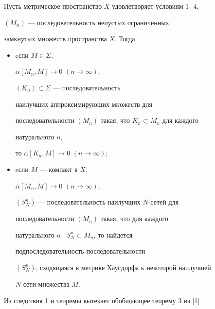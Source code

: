 \begin{thmnonum}


Пусть метрическое пространство $X$ удовлетворяет условиям $1$--\,$4$,


$(M_{n})$ --- последовательность непустых ограниченных 


замкнутых множеств пространства $X$. Тогда 


\begin{itemize}


\item[A.] eсли $M \in \Sigma$,


$\alpha [M_{n},M] \rightarrow 0$ $(n \rightarrow \infty)$, 


$(K_{n}) \subset \Sigma $ --- последовательность 


наилучших аппроксимирующих множеств для 


последовательности $(M_{n})$ такая, что $K_{n} \subset M_{n}$ для каждого


натурального $n$,


то $\alpha [K_{n},M] \rightarrow 0$ $(n \rightarrow \infty);$




\item[B.] eсли $M$ --- компакт в $X$,


$\alpha [M_{n},M] \rightarrow 0$ $(n \rightarrow \infty)$, 


$(S_{N}^{n})$ --- последовательность наилучших $N$-сетей для


последовательности $(M_{n})$ такая, что для каждого


натурального $n$ \ $S_{N}^{n} \subset M_{n}$, то найдется 


подпоследовательность последовательности


$(S_{N}^{n})$, сходящаяся в метрике Хаусдорфа к некоторой наилучшей 


$N$-сети множества $M$.


\end{itemize}


\end{thmnonum}





Из следствия 1 и теоремы вытекает обобщающее теорему 3 из [1]





